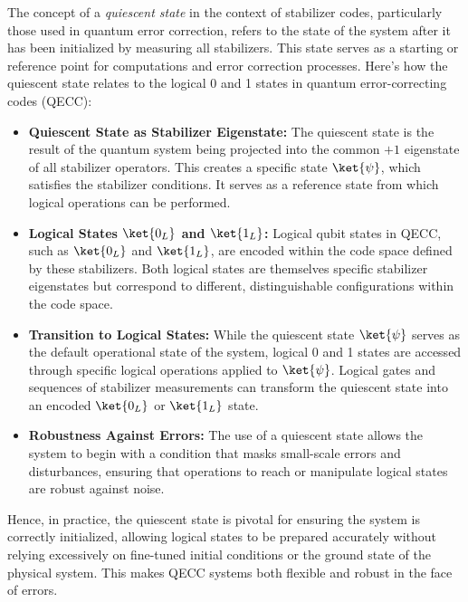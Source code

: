 \begin{airesult}
The concept of a \textit{quiescent state} in the context of stabilizer codes, particularly those
used in quantum error correction, refers to the state of the system after it has been initialized by
measuring all stabilizers. This state serves as a starting or reference point for computations and
error correction processes. Here's how the quiescent state relates to the logical 0 and 1 states in
quantum error-correcting codes (QECC):

\vsp

\begin{itemize}
  \item \textbf{Quiescent State as Stabilizer Eigenstate:} The quiescent state is the result of the
quantum system being projected into the common \(+1\) eigenstate of all stabilizer operators. This
creates a specific state \(\ket{\psi}\), which satisfies the stabilizer conditions. It serves as a
reference state from which logical operations can be performed.

  \item \textbf{Logical States \(\ket{0_L}\) and \(\ket{1_L}\):} Logical qubit states in QECC, such
as \(\ket{0_L}\) and \(\ket{1_L}\), are encoded within the code space defined by these stabilizers.
Both logical states are themselves specific stabilizer eigenstates but correspond to different,
distinguishable configurations within the code space.

  \item \textbf{Transition to Logical States:} While the quiescent state \(\ket{\psi}\) serves as
the default operational state of the system, logical 0 and 1 states are accessed through specific
logical operations applied to \(\ket{\psi}\). Logical gates and sequences of stabilizer measurements
can transform the quiescent state into an encoded \(\ket{0_L}\) or \(\ket{1_L}\) state.

  \item \textbf{Robustness Against Errors:} The use of a quiescent state allows the system to begin
with a condition that masks small-scale errors and disturbances, ensuring that operations to reach
or manipulate logical states are robust against noise.

\end{itemize}

\vsp

Hence, in practice, the quiescent state is pivotal for ensuring the system is correctly initialized,
allowing logical states to be prepared accurately without relying excessively on fine-tuned initial
conditions or the ground state of the physical system. This makes QECC systems both flexible and
robust in the face of errors.
\end{airesult}


